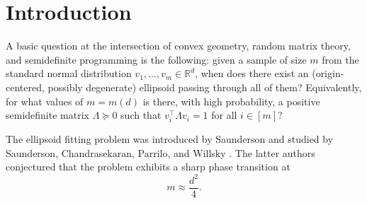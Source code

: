 \documentclass[12pt]{article}
\def \R {\mathbb{R}}
\newtheorem{definition}[theorem]{Definition}
\newcommand{\todo}[1]{\textcolor{red}{(#1)}}
\newcommand{\Authornote}[3]{{\sf\footnotesize\color{#3}{[#1: #2]}}}
\newcommand{\Authornote}[3]{}
\newcommand{\jnote}[1]{\Authornote{Jeff}{#1}{blue}}
\newcommand{\snote}[1]{\Authornote{Sofia}{#1}{orange}}
\begin{document}
\begin{abstract}

\end{abstract}
\clearpage
\newpage
\thispagestyle{empty}
\setcounter{page}{0}


\thispagestyle{empty}
\setcounter{page}{0}
\thispagestyle{empty}
\setcounter{page}{0}
\tableofcontents
\clearpage \newpage

\section{Introduction}

A basic question at the intersection of convex geometry, random matrix theory,
and semidefinite programming is the following: given a sample of size $m$ from the standard normal distribution \(v_1,\ldots,v_m\in \mathbb R^d\),
when does there exist an (origin-centered, possibly degenerate) ellipsoid passing
through all of them?  Equivalently, for what values of \(m=m(d)\) is there,
with high probability, a positive semidefinite matrix \(\Lambda\succeq 0\) such that  $v_i^\top \Lambda v_i = 1$ for all $i\in [m]$?

The ellipsoid fitting problem was introduced by Saunderson \cite{Saunderson11}
and studied by Saunderson, Chandrasekaran,
Parrilo, and Willsky \cite{SCPW12,SPW13}. The latter authors conjectured that the
problem exhibits a sharp phase transition at
\[
    m \approx \frac{d^2}{4}.
\]
\end{document}
